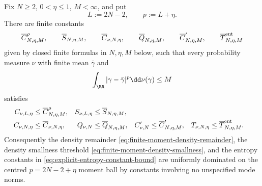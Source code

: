 \begin{lemma}%
\label{lem:moment-ball-uniform-constant-domination}
Fix $N\ge2$, $0<\eta\le1$, \(M<\infty\), and put
\[
L:=2N-2,\qquad p:=L+\eta.
\]
There are finite constants
\[
\overline C_{N,\eta,M}^{\rho},\qquad
\overline S_{N,\eta,M},
\qquad
\overline C_{\nu,N,\eta},\qquad
\overline Q_{N,\eta,M},\qquad
\overline C'_{N,\eta,M},\qquad
\overline T_{N,\eta,M}^{\rm ent}
\]
given by closed finite formulas in $N,\eta,M$ below, such that every
probability measure $\nu$ with finite mean $\bar{\gamma}$ and
\[
\int_{\RR}|\gamma-\bar{\gamma}|^p\dd\nu(\gamma)\le M
\]
satisfies
\begin{align*}
C_{\nu,L,\eta}&\le \overline C_{N,\eta,M}^{\rho},
&
S_{\nu,L,\eta}&\le \overline S_{N,\eta,M},
\\
C_{\nu,N,\eta}&\le \overline C_{\nu,N,\eta},
&
Q_{\nu,N}&\le \overline Q_{N,\eta,M},
&
C'_{\nu,N}&\le \overline C'_{N,\eta,M},
&
T_{\nu,N,\eta}&\le
\overline T_{N,\eta,M}^{\rm ent}.
\end{align*}
Consequently the density remainder
\eqref{eq:finite-moment-density-remainder}, the density smallness threshold
\eqref{eq:finite-moment-density-smallness}, and the entropy constants in
\eqref{eq:explicit-entropy-constant-bound} are uniformly dominated on the
centred \(p=2N-2+\eta\) moment ball by constants involving no unspecified
mode norms.
\end{lemma}

